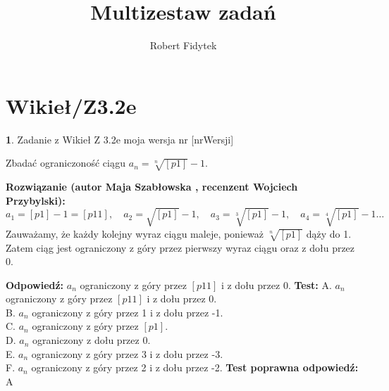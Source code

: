 \documentclass[12pt, a4paper]{article}
\title{Multizestaw zadań}
\author{Robert Fidytek}
\date{}
\theoremstyle{definition} %
\newtheorem{zad}{}
\newcommand{\kategoria}[1]{\section{#1}} %
\newcommand{\zadStart}[1]{\begin{zad}#1\newline} %
\newcommand{\zadStop}{\end{zad}}   %
\newcommand{\rozwStart}[2]{\noindent \textbf{Rozwiązanie (autor #1 , recenzent #2): }\newline} %
\newcommand{\rozwStop}{\newline}                                            %
\newcommand{\odpStart}{\noindent \textbf{Odpowiedź:}\newline}    %
\newcommand{\odpStop}{\newline}                                             %
\newcommand{\testStart}{\noindent \textbf{Test:}\newline} %
\newcommand{\testStop}{\newline} %
\newcommand{\kluczStart}{\noindent \textbf{Test poprawna odpowiedź:}\newline} %
\newcommand{\kluczStop}{\newline} %
\begin{document}
\maketitle


\kategoria{Wikieł/Z3.2e}
\zadStart{Zadanie z Wikieł Z 3.2e moja wersja nr [nrWersji]}

Zbadać ograniczoność ciągu $a_{n}=\sqrt[n]{[p1]}-1.$
\zadStop

\rozwStart{Maja Szabłowska}{Wojciech Przybylski}
$$a_{1}=[p1]-1=[p11], \quad a_{2}=\sqrt{[p1]}-1, \quad a_{3}=\sqrt[3]{[p1]}-1, \quad a_{4}=\sqrt[4]{[p1]}-1 \ldots$$
Zauważamy, że każdy kolejny wyraz ciągu maleje, ponieważ $\sqrt[n]{[p1]}$ dąży do 1. Zatem ciąg jest ograniczony z góry przez pierwszy wyraz ciągu oraz z dołu przez 0.
\rozwStop


\odpStart
$a_{n}$ ograniczony z góry przez $[p11]$ i z dołu przez 0.
\odpStop
\testStart
A. $a_{n}$ ograniczony z góry przez $[p11]$ i z dołu przez 0.\\
B. $a_{n}$ ograniczony z góry przez 1 i z dołu przez -1.\\
C. $a_{n}$ ograniczony z góry przez $[p1]$.\\
D. $a_{n}$ ograniczony z dołu przez 0.\\
E. $a_{n}$ ograniczony z góry przez 3 i z dołu przez -3.\\
F. $a_{n}$ ograniczony z góry przez 2 i z dołu przez -2.
\testStop
\kluczStart
A
\kluczStop
\end{document}
